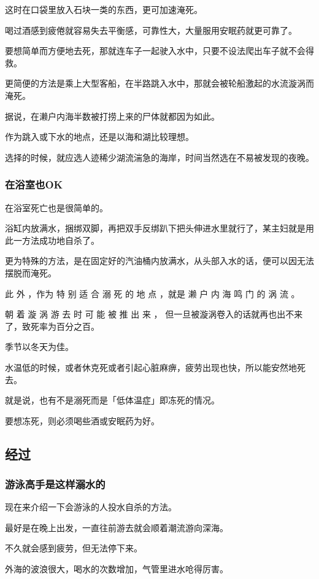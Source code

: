\documentclass[UTF8]{ctexart}
\begin{document}
这时在口袋里放入石块一类的东西，更可加速淹死。 

喝过酒感到疲倦就容易失去平衡感，可靠性大，大量服用安眠药就更可靠了。

要想简单而方便地去死，那就连车子一起驶入水中，只要不设法爬出车子就不会得救。

更简便的方法是乘上大型客船，在半路跳入水中，那就会被轮船激起的水流漩涡而淹死。

据说，在濑户内海半数被打捞上来的尸体就都因为如此。

作为跳入或下水的地点，还是以海和湖比较理想。

选择的时候，就应选人迹稀少湖流湍急的海岸，时间当然选在不易被发现的夜晚。

\subsubsection*{在浴室也OK}

在浴室死亡也是很简单的。

浴缸内放满水，捆绑双脚，再把双手反绑趴下把头伸进水里就行了，某主妇就是用此一方法成功地自杀了。

更为特殊的方法，是在固定好的汽油桶内放满水，从头部入水的话，便可以因无法摆脱而淹死。

此 外 ，作为 特 别 适 合 溺 死 的 地 点 ，就是 濑 户 内 海 鸣 门 的 涡 流 。

朝 着 漩 涡 游 去 时 可 能 被 推 出 来 ， 但一旦被漩涡卷入的话就再也出不来了，致死率为百分之百。

季节以冬天为佳。

水温低的时候，或者休克死或者引起心脏麻痹，疲劳出现也快，所以能安然地死去。

就是说，也有不是溺死而是「低体温症」即冻死的情况。

要想冻死，则必须喝些酒或安眠药为好。

\subsection{经过}

\subsubsection*{游泳高手是这样溺水的}

现在来介绍一下会游泳的人投水自杀的方法。

最好是在晚上出发，一直往前游去就会顺着潮流游向深海。

不久就会感到疲劳，但无法停下来。

外海的波浪很大，喝水的次数增加，气管里进水呛得厉害。
\end{document}
